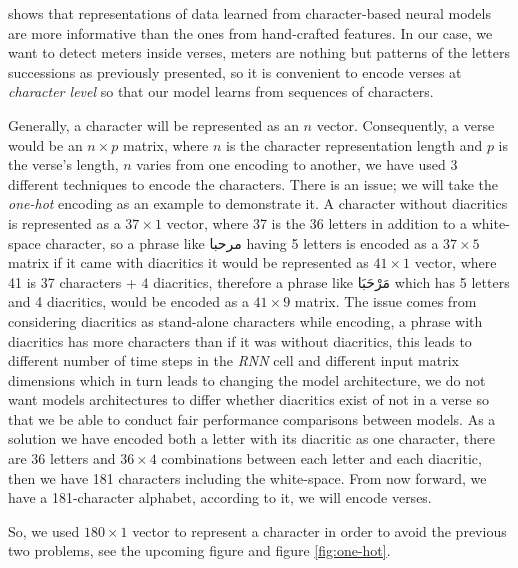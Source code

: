\documentclass[12pt]{report}
\begin{document}
\citet{Agirrezabal2017} shows that representations of data learned from
character-based neural models are more informative than the ones from
hand-crafted features. 
In our case, we want to detect meters inside verses, meters are nothing but
patterns of the letters successions as previously presented, so it is convenient
to encode verses at \textit{character level} so that our model learns from
sequences of characters.


Generally, a character will be represented as an $n$ vector. Consequently, a
verse would be an $n \times p$ matrix, where $n$ is the character representation
length  and $p$ is the verse's length,
$n$ varies from one encoding to another, we have used 3 different
techniques to encode the characters.
There is an issue; we will take the \textit{one-hot} encoding as an example to
demonstrate it.  A character without diacritics is represented as a $37 \times 1$
vector, where 37 is the 36 letters in addition to a white-space character, so a
phrase like \textarabic{مرحبا} having 5 letters is encoded as a $37 \times 5$
matrix if it came with diacritics it would be represented as $41 \times 1$
vector, where 41 is 37 characters + $4$ diacritics, therefore  a phrase like
\textarabic{مَرْحَبَا} which has 5 letters and 4 diacritics, would be encoded as a
$41 \times 9$ matrix.  The issue comes from considering diacritics as stand-alone
characters while encoding, a phrase with diacritics has more characters than if
it was without diacritics, this leads to different number of time steps in the
\textit{RNN} cell and different input matrix dimensions which in turn leads to
changing the model architecture, we do not want models architectures to differ
whether diacritics exist of not in a verse so that we be able to conduct
fair performance comparisons between models. 
As a solution we have encoded both a letter with its diacritic as one character,
there are 36 letters and $36 \times 4$ combinations between each letter and each
diacritic, then we have 181 characters including the white-space. From now
forward, we have a 181-character alphabet, according to it, we will encode verses.

So, we used $180 \times 1$ vector to represent a character in order to avoid the
previous two problems, see the upcoming figure  and figure
\ref{fig:one-hot}.
\end{document}
